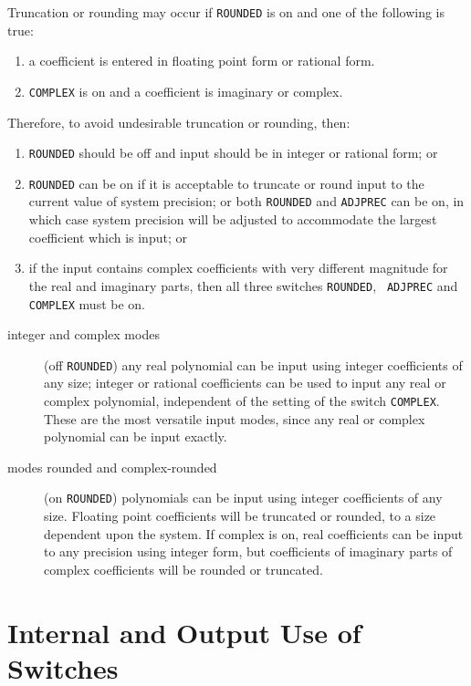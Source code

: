 Truncation or rounding may occur if {\tt ROUNDED} is on and
one of the following is true:

\begin{enumerate}
\item a coefficient is entered in floating point form or rational form.
\item {\tt COMPLEX} is on and a coefficient is imaginary or complex.
\end{enumerate}

Therefore, to avoid undesirable truncation or rounding, then:

\begin{enumerate}
\item {\tt ROUNDED} should be off and input should be
in integer or rational form; or
\item {\tt ROUNDED} can be on if it is acceptable to truncate or round
input to the current value of system precision; or both {\tt ROUNDED} and
{\tt ADJPREC} can be on, in which case system precision will be adjusted
to accommodate the largest coefficient which is input; or \item if the
input contains complex coefficients with very different magnitude for the
real and imaginary parts, then all three switches {\tt ROUNDED}, {\tt
ADJPREC} and {\tt COMPLEX} must be on.
\end{enumerate}

\begin{description}
\item[integer and complex modes] (off {\tt ROUNDED}) any real
polynomial can be input using integer coefficients of any size; integer or
rational coefficients can be used to input any real or complex polynomial,
independent of the setting of the switch {\tt COMPLEX}.  These are the most
versatile input modes, since any real or complex polynomial can be input
exactly.

\item[modes rounded and complex-rounded] (on {\tt ROUNDED}) polynomials can be
input using
integer coefficients of any size.  Floating point coefficients will be
truncated or rounded, to a size dependent upon the system.  If complex
is on, real coefficients can be input to any precision using integer
form, but coefficients of imaginary parts of complex coefficients will
be rounded or truncated.
\end{description}

\section{Internal and Output Use of Switches}


